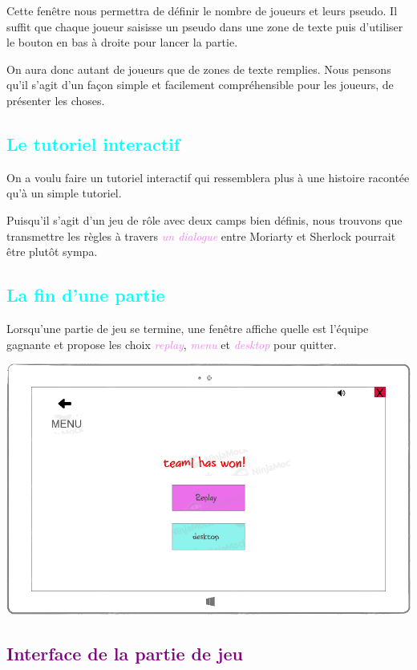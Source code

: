 \documentclass[a4paper]{article}
\let\oldsection\section
\renewcommand{\section}[1]{\textcolor{purple}{\oldsection{#1}}}
\let\oldsubsection\subsection
\renewcommand{\subsection}[1]{\textcolor{cyan}{\oldsubsection{#1}}}
\let\oldtextit\textit
\renewcommand{\textit}[1]{\textcolor{violet}{\oldtextit{#1}}}
\begin{document}
Cette fenêtre nous permettra de définir le nombre de joueurs et leurs pseudo. Il suffit que chaque joueur saisisse un pseudo dans une zone de texte puis d'utiliser le bouton en bas à droite pour lancer la partie.

On aura donc autant de joueurs que de zones de texte remplies. Nous pensons qu'il s'agit d'un façon simple et facilement compréhensible pour les joueurs, de présenter les choses.

\subsection{Le tutoriel interactif}

On a voulu faire un tutoriel interactif qui ressemblera plus à une histoire racontée qu'à un simple tutoriel.

Puisqu'il s'agit d'un jeu de rôle avec deux camps bien définis, nous trouvons que transmettre les règles à travers \textit{un dialogue} entre Moriarty et Sherlock pourrait être plutôt sympa.

\subsection{La fin d'une partie}

Lorsqu'une partie de jeu se termine, une fenêtre affiche quelle est l'équipe gagnante et propose les choix \textit{replay}, \textit{menu} et \textit{desktop} pour quitter.

\begin{center}
    \includegraphics[scale=2]{img/ecran_fin_partie.png}
\end{center}

\section{Interface de la partie de jeu}
\end{document}
